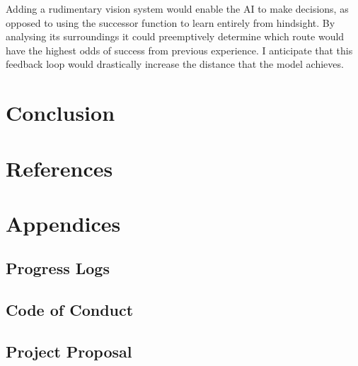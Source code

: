 \documentclass{article}
\begin{document}
Adding a rudimentary vision system would enable the AI to make decisions, as opposed to using the successor function to learn entirely from hindsight. By analysing its surroundings it could preemptively determine which route would have the highest odds of success from previous experience. I anticipate that this feedback loop would drastically increase the distance that the model achieves. 



\newpage
\section{Conclusion}

\newpage

\section{References}

\newpage
\section{Appendices}
\subsection{Progress Logs}
\subsection{Code of Conduct}
\subsection{Project Proposal}
\end{document}
